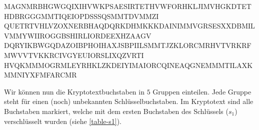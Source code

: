 \begin{example}
{\colorbox{orange!30}{M}AGNM\colorbox{orange!30}{R}BHGW\colorbox{orange!30}{G}QIXI\colorbox{orange!30}{H}VWKP\colorbox{orange!30}{S}AESI\colorbox{orange!30}{R}TETH\colorbox{orange!30}{V}WFOR\colorbox{orange!30}{H}KLJI\colorbox{orange!30}{M}VHGK\colorbox{orange!30}{D}TETH\colorbox{orange!30}{D}BRGG\colorbox{orange!30}{G}MMTI\colorbox{orange!30}{Q}EIOP\colorbox{orange!30}{D}SSSQ\colorbox{orange!30}{S}MMTD\colorbox{orange!30}{V}MMZI\\
\colorbox{orange!30}{Q}UETR\colorbox{orange!30}{T}VHLV\colorbox{orange!30}{Z}OXNE\colorbox{orange!30}{R}BHAQ\colorbox{orange!30}{D}QRKD\colorbox{orange!30}{H}MKKK\colorbox{orange!30}{D}AINI\colorbox{orange!30}{M}MVGR\colorbox{orange!30}{S}ESXX\colorbox{orange!30}{D}BMIL\colorbox{orange!30}{V}MMYW\colorbox{orange!30}{I}IROG\colorbox{orange!30}{G}BSHI\colorbox{orange!30}{R}LIOR\colorbox{orange!30}{D}EEXH\colorbox{orange!30}{Z}AAGV\\
\colorbox{orange!30}{D}QRYI\colorbox{orange!30}{K}BWGQ\colorbox{orange!30}{D}AZOI\colorbox{orange!30}{B}PHOI\colorbox{orange!30}{H}AXJS\colorbox{orange!30}{B}PIIL\colorbox{orange!30}{S}MMTJ\colorbox{orange!30}{Z}KLOR\colorbox{orange!30}{C}MRHV\colorbox{orange!30}{T}VRKR\colorbox{orange!30}{F}MWVV\colorbox{orange!30}{T}VKKR\colorbox{orange!30}{C}IVGY\colorbox{orange!30}{E}UIOR\colorbox{orange!30}{S}LIXQ\colorbox{orange!30}{Z}VRTI\\
\colorbox{orange!30}{H}VQKM\colorbox{orange!30}{M}MOGR\colorbox{orange!30}{M}LEYR\colorbox{orange!30}{H}KLZK\colorbox{orange!30}{D}EIYI\colorbox{orange!30}{M}AIOR\colorbox{orange!30}{C}QINE\colorbox{orange!30}{A}QGNE\colorbox{orange!30}{M}MMTI\colorbox{orange!30}{L}AXKM\colorbox{orange!30}{M}NIYX\colorbox{orange!30}{F}MFAR\colorbox{orange!30}{C}MR
}\\

\end{example}


\normalsize

Wir können nun die Kryptotextbuchstaben in $5$ Gruppen einteilen. Jede Gruppe steht für einen (noch) unbekannten Schlüsselbuchstaben. Im Kryptotext sind alle Buchstaben markiert, welche mit dem ersten Buchstaben des Schlüssels ($s_1$) verschlüsselt wurden (siehe \autoref{table-s1}). 


